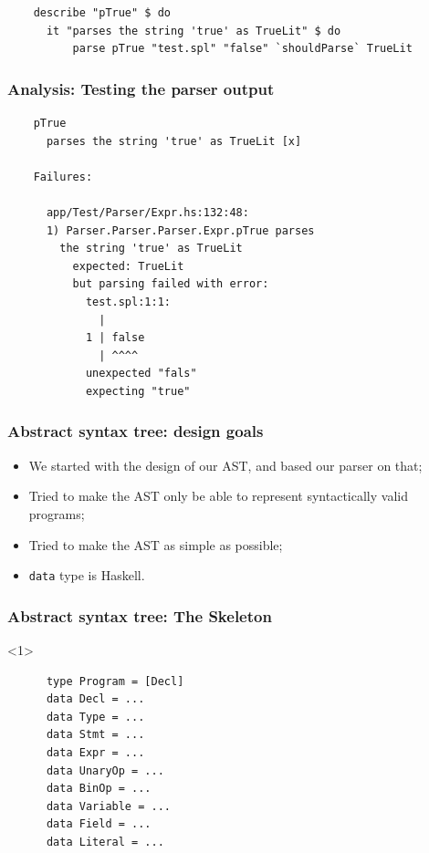 \documentclass{beamer}
\begin{document}
\begin{frame}[fragile]
  \begin{verbatim}
    describe "pTrue" $ do
      it "parses the string 'true' as TrueLit" $ do
          parse pTrue "test.spl" "false" `shouldParse` TrueLit
  \end{verbatim}
\end{frame}

\begin{frame}[fragile]
  \frametitle{Analysis: Testing the parser output}
  
  \begin{verbatim}
    pTrue
      parses the string 'true' as TrueLit [x]

    Failures:

      app/Test/Parser/Expr.hs:132:48: 
      1) Parser.Parser.Parser.Expr.pTrue parses 
        the string 'true' as TrueLit
          expected: TrueLit
          but parsing failed with error:
            test.spl:1:1:
              |
            1 | false
              | ^^^^
            unexpected "fals"
            expecting "true"
  \end{verbatim}
\end{frame}


\begin{frame}
  \frametitle{Abstract syntax tree: design goals}

  \begin{itemize}
    \item We started with the design of our AST, and based our parser on that;
    \item Tried to make the AST only be able to represent syntactically valid programs;
    \item Tried to make the AST as simple as possible;
    \item \texttt{data} type is Haskell.
  \end{itemize}
\end{frame}

\begin{frame}[fragile]
  \frametitle{Abstract syntax tree: The Skeleton}
  \begin{onlyenv}<1>
    \begin{verbatim}
      type Program = [Decl] 
      data Decl = ... 
      data Type = ... 
      data Stmt = ... 
      data Expr = ... 
      data UnaryOp = ... 
      data BinOp = ... 
      data Variable = ...
      data Field = ...
      data Literal = ...
    \end{verbatim}
  \end{onlyenv}
\end{frame}
\end{document}
